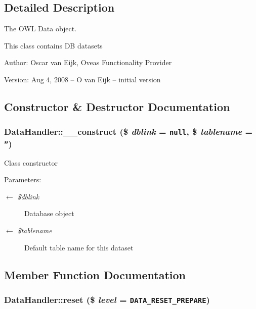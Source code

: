 \subsection{Detailed Description}
The OWL Data object. 

This class contains DB datasets \begin{Desc}
\item[Author:]Oscar van Eijk, Oveas Functionality Provider \end{Desc}
\begin{Desc}
\item[Version:]Aug 4, 2008 -- O van Eijk -- initial version \end{Desc}


\subsection{Constructor \& Destructor Documentation}
\hypertarget{classDataHandler_4eef16167dd9a5bc94bd0cb40ce1b180}{
\subsubsection{\setlength{\rightskip}{0pt plus 5cm}DataHandler::\_\-\_\-construct (\$ {\em dblink} = {\tt null}, \$ {\em tablename} = {\tt ''})}}
\label{classDataHandler_4eef16167dd9a5bc94bd0cb40ce1b180}


Class constructor \begin{Desc}
\item[Parameters:]
\begin{description}
\item[\mbox{$\leftarrow$} {\em \$dblink}]Database object \item[\mbox{$\leftarrow$} {\em \$tablename}]Default table name for this dataset \end{description}
\end{Desc}


\subsection{Member Function Documentation}
\hypertarget{classDataHandler_b89e1aaad9cd0a37f1c7f13c1d9c0d57}{
\subsubsection{\setlength{\rightskip}{0pt plus 5cm}DataHandler::reset (\$ {\em level} = {\tt {\bf DATA\_\-RESET\_\-PREPARE}})}}
\label{classDataHandler_b89e1aaad9cd0a37f1c7f13c1d9c0d57}


